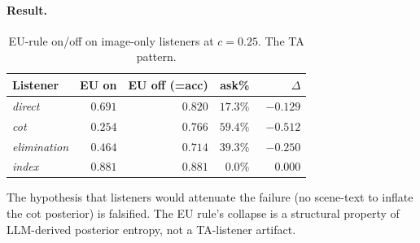 \documentclass[11pt]{article}
\begin{document}
\paragraph{Result.}
\begin{table}[H]
\centering
\small
\setlength{\tabcolsep}{6pt}
\begin{tabular}{lrrrr}
\toprule
Listener & EU on & EU off (=acc) & ask\% & $\Delta$ \\
\midrule
\textit{direct}      & $0.691$ & $0.820$ & $17.3\%$ & $-0.129$ \\
\textit{cot}         & $0.254$ & $0.766$ & $59.4\%$ & $-0.512$ \\
\textit{elimination} & $0.464$ & $0.714$ & $39.3\%$ & $-0.250$ \\
\textit{index}       & $0.881$ & $0.881$ & $\phantom{0}0.0\%$ & $\phantom{-}0.000$ \\
\bottomrule
\end{tabular}
\caption{EU-rule on/off on image-only listeners at $c{=}0.25$. The TA
pattern.}
\label{tab:l-io}
\end{table}

The hypothesis that listeners would attenuate the failure (no
scene-text to inflate the cot posterior) is falsified. The EU rule's
collapse is a structural property of LLM-derived posterior entropy,
not a TA-listener artifact.

% 
% 
% 
\end{document}
